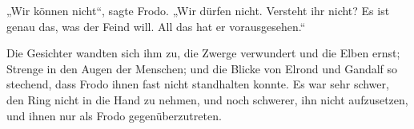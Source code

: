 „Wir können nicht“, sagte Frodo. „Wir dürfen nicht. Versteht ihr nicht? Es ist genau das, was der Feind will. All das hat er vorausgesehen.“

Die Gesichter wandten sich ihm zu, die Zwerge verwundert und die Elben ernst; Strenge in den Augen der Menschen; und die Blicke von Elrond und Gandalf so stechend, dass Frodo ihnen fast nicht standhalten konnte. Es war sehr schwer, den Ring nicht in die Hand zu nehmen, und noch schwerer, ihn nicht aufzusetzen, und ihnen nur als Frodo gegenüberzutreten.

